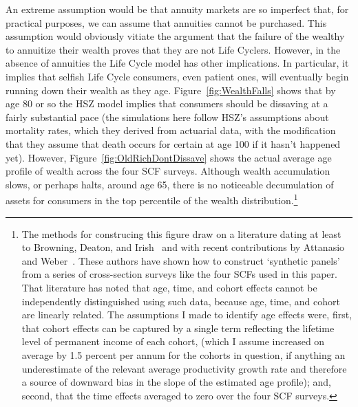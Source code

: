 \documentclass[titlepage,12pt]{article}
\begin{document}
An extreme assumption would be that annuity markets are so imperfect 
that, for practical purposes, we can assume that annuities cannot be 
purchased.  This assumption would obviously vitiate the argument that 
the failure of the wealthy to annuitize their wealth proves that they 
are not Life Cyclers.  However, in the absence of annuities the Life 
Cycle model has other implications.  In particular, it implies that 
selfish Life Cycle consumers, even patient ones, will eventually begin 
running down their wealth as they age.  Figure~\ref{fig:WealthFalls} 
shows that by age 80 or so the HSZ model implies that consumers should 
be dissaving at a fairly substantial pace (the simulations here follow 
HSZ's assumptions about mortality rates, which they derived from 
actuarial data, with the modification that they assume that death 
occurs for certain at age 100 if it hasn't happened yet).  However, 
Figure~\ref{fig:OldRichDontDissave} shows the actual average age 
profile of wealth across the four SCF surveys.  Although wealth 
accumulation slows, or perhaps halts, around age 65, there is no 
noticeable decumulation of assets for consumers in the top percentile 
of the wealth distribution.\footnote{The methods for construcing this 
figure draw on a literature dating at least to Browning, Deaton, and 
Irish~\citeyear{bdiProfitable} and with recent contributions by Attanasio 
and Weber~\citeyear{aw95}.  These authors have shown how to 
construct `synthetic panels' from a series of cross-section surveys 
like the four SCFs used in this paper.  That literature has noted that 
age, time, and cohort effects cannot be independently distinguished 
using such data, because age, time, and cohort are linearly related. 
The assumptions I made to identify age effects were, first, that 
cohort effects can be captured by a single term reflecting the 
lifetime level of permanent income of each cohort, (which I assume 
increased on average by 1.5 percent per annum for the cohorts in 
question, if anything an underestimate of the relevant average 
productivity growth rate and therefore a source of downward bias in 
the slope of the estimated age profile); and, second, that the time 
effects averaged to zero over the four SCF surveys.}
\end{document}
